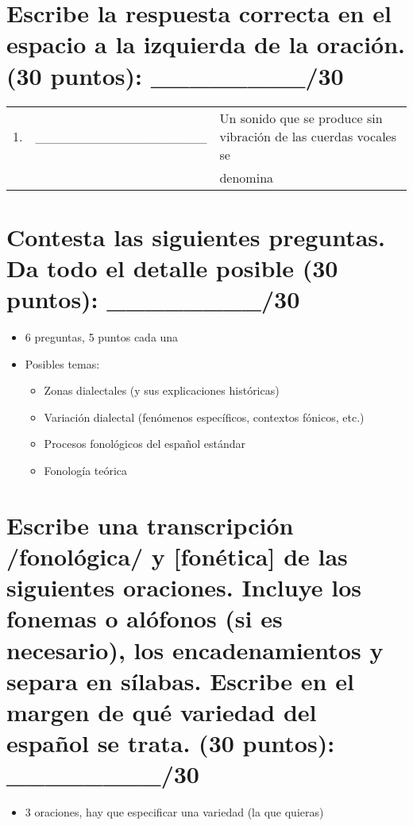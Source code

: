 \documentclass[12pt]{exam}
\begin{document}
\vspace{0.1in} 


\section{Escribe la respuesta correcta en el espacio a la izquierda de la oración. (30 puntos): \_\_\_\_\_\_\_\_/30}

\renewcommand{\arraystretch}{1.95}
	\begin{tabular}{@{}llp{2cm}@{}}
	 1.  & \_\_\_\_\_\_\_\_\_\_\_\_\_\_\_\_\_\_ & Un sonido que se produce sin vibración de las cuerdas vocales se \\&& denomina        \\
	\end{tabular}

\vspace{.4in}

\section{Contesta las siguientes preguntas. Da todo el detalle posible (30 puntos): \_\_\_\_\_\_\_\_/30}

\begin{itemize}
	\item 6 preguntas, 5 puntos cada una
	\item Posibles temas:
	\begin{itemize}
		\item Zonas dialectales (y sus explicaciones históricas)
		\item Variación dialectal (fenómenos específicos, contextos fónicos, etc.)
		\item Procesos fonológicos del español estándar
		\item Fonología teórica
	\end{itemize}
\end{itemize}

\vspace{.4in}

\section{Escribe una transcripción /fonológica/ y [fonética] de las siguientes oraciones. Incluye los fonemas o alófonos (si es necesario), los encadenamientos y separa en sílabas. Escribe en el margen de qué variedad del español se trata. (30 puntos): \_\_\_\_\_\_\_\_/30}

\begin{itemize}
	\item 3 oraciones, hay que especificar una variedad (la que quieras)
\end{itemize}
\end{document}
